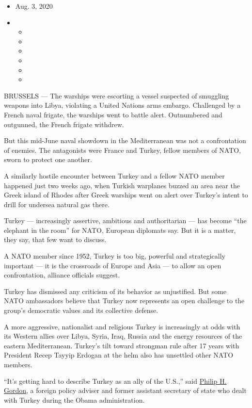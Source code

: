 \begin{itemize}
\item
  Aug. 3, 2020
\item
  \begin{itemize}
  \item
  \item
  \item
  \item
  \item
  \item
  \end{itemize}
\end{itemize}

BRUSSELS --- The warships were escorting a vessel suspected of smuggling
weapons into Libya, violating a United Nations arms embargo. Challenged
by a French naval frigate, the warships went to battle alert.
Outnumbered and outgunned, the French frigate withdrew.

But this mid-June naval showdown in the Mediterranean was not a
confrontation of enemies. The antagonists were France and Turkey, fellow
members of NATO, sworn to protect one another.

A similarly hostile encounter between Turkey and a fellow NATO member
happened just two weeks ago, when Turkish warplanes buzzed an area near
the Greek island of Rhodes after Greek warships went on alert over
Turkey's intent to drill for undersea natural gas there.

Turkey --- increasingly assertive, ambitious and authoritarian --- has
become ``the elephant in the room'' for NATO, European diplomats say.
But it is a matter, they say, that few want to discuss.

A NATO member since 1952, Turkey is too big, powerful and strategically
important --- it is the crossroads of Europe and Asia --- to allow an
open confrontation, alliance officials suggest.

Turkey has dismissed any criticism of its behavior as unjustified. But
some NATO ambassadors believe that Turkey now represents an open
challenge to the group's democratic values and its collective defense.

A more aggressive, nationalist and religious Turkey is increasingly at
odds with its Western allies over Libya, Syria, Iraq, Russia and the
energy resources of the eastern Mediterranean. Turkey's tilt toward
strongman rule after 17 years with President Recep Tayyip Erdogan at the
helm also has unsettled other NATO members.

``It's getting hard to describe Turkey as an ally of the U.S.,'' said
\href{https://www.cfr.org/expert/philip-h-gordon}{Philip H. Gordon}, a
foreign policy adviser and former assistant secretary of state who dealt
with Turkey during the Obama administration.

